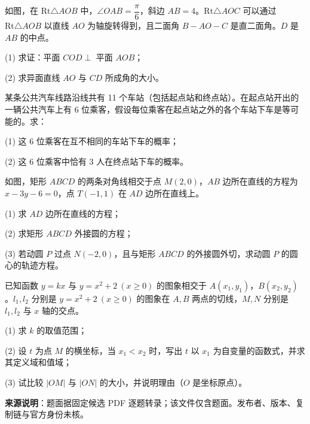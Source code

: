 \Needspace{0.4\textheight}
\begin{question}
如图，在 $\mathrm{Rt}\triangle AOB$ 中，$\angle OAB=\dfrac{\pi}{6}$，斜边 $AB=4$。$\mathrm{Rt}\triangle AOC$ 可以通过 $\mathrm{Rt}\triangle AOB$ 以直线 $AO$ 为轴旋转得到，且二面角 $B-AO-C$ 是直二面角。$D$ 是 $AB$ 的中点。

(1) 求证：平面 $COD\perp$ 平面 $AOB$；

(2) 求异面直线 $AO$ 与 $CD$ 所成角的大小。
\nopagebreak[4]
\begin{center}\end{center}
\nopagebreak[4]
\end{question}
\begin{question}
某条公共汽车线路沿线共有 11 个车站（包括起点站和终点站）。在起点站开出的一辆公共汽车上有 6 位乘客，假设每位乘客在起点站之外的各个车站下车是等可能的。求：

(1) 这 6 位乘客在互不相同的车站下车的概率；

(2) 这 6 位乘客中恰有 3 人在终点站下车的概率。

\Needspace{0.4\textheight}
\end{question}
\begin{question}
如图，矩形 $ABCD$ 的两条对角线相交于点 $M(2,0)$，$AB$ 边所在直线的方程为 $x-3y-6=0$，点 $T(-1,1)$ 在 $AD$ 边所在直线上。

(1) 求 $AD$ 边所在直线的方程；

(2) 求矩形 $ABCD$ 外接圆的方程；

(3) 若动圆 $P$ 过点 $N(-2,0)$，且与矩形 $ABCD$ 的外接圆外切，求动圆 $P$ 的圆心的轨迹方程。
\nopagebreak[4]
\begin{center}\end{center}
\nopagebreak[4]
\end{question}
\begin{question}
已知函数 $y=kx$ 与 $y=x^2+2\ (x\geq 0)$ 的图象相交于 $A(x_1,y_1)$，$B(x_2,y_2)$。$l_1,l_2$ 分别是 $y=x^2+2\ (x\geq 0)$ 的图象在 $A,B$ 两点的切线，$M,N$ 分别是 $l_1,l_2$ 与 $x$ 轴的交点。

(1) 求 $k$ 的取值范围；

(2) 设 $t$ 为点 $M$ 的横坐标，当 $x_1<x_2$ 时，写出 $t$ 以 $x_1$ 为自变量的函数式，并求其定义域和值域；

(3) 试比较 $|OM|$ 与 $|ON|$ 的大小，并说明理由（$O$ 是坐标原点）。

\begin{gktip}
\textbf{来源说明}：题面据固定候选 PDF 逐题转录；该文件仅含题面。发布者、版本、复制链与官方身份未核。
\end{gktip}

\end{question}